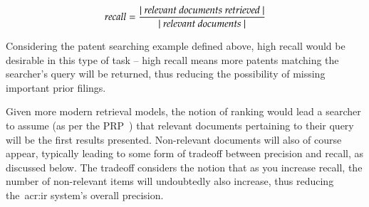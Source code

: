 \begin{equation*}
recall = \frac{|~\text{\emph{relevant documents retrieved}}~|}{|~\text{\emph{relevant documents}}~|}
\end{equation*}

Considering the patent searching example defined above, high recall would be desirable in this type of task -- high recall means more patents matching the searcher's query will be returned, thus reducing the possibility of missing important prior filings.

Given more modern retrieval models, the notion of ranking would lead a searcher to assume (as per the PRP~\citep{robertson1977prp}) that relevant documents pertaining to their query will be the first results presented. Non-relevant documents will also of course appear, typically leading to some form of tradeoff between precision and recall, as discussed below. The tradeoff considers the notion that as you increase recall, the number of non-relevant items will undoubtedly also increase, thus reducing the~\gls{acr:ir} system's overall precision.

%
%

